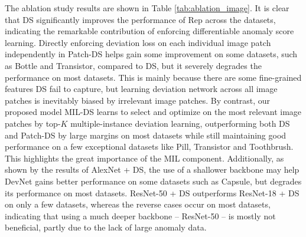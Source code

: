 \documentclass[10pt,journal,compsoc]{IEEEtran}
\begin{document}
The ablation study results are shown in Table \ref{tab:ablation_image}. It is clear that DS significantly improves the performance of Rep across the datasets, indicating the remarkable contribution of enforcing differentiable anomaly score learning. Directly enforcing deviation loss on each individual image patch independently in Patch-DS helps gain some improvement on some datasets, such as Bottle and Transistor, compared to DS, but it severely degrades the performance on most datasets. This is mainly because there are some fine-grained features DS fail to capture, but learning deviation network across all image patches is inevitably biased by irrelevant image patches. By contrast, our proposed model MIL-DS learns to select and optimize on the most relevant image patches by top-$K$ multiple-instance deviation learning, outperforming both DS and Patch-DS by large margins on most datasets while still maintaining good performance on a few exceptional datasets like Pill, Transistor and Toothbrush. This highlights the great importance of the MIL component. Additionally, as shown by the results of AlexNet + DS, the use of a shallower backbone may help DevNet gains better performance on some datasets such as Capsule, but degrades its performance on most datasets. ResNet-50 + DS outperforms ResNet-18 + DS on only a few datasets, whereas the reverse cases occur on most datasets, indicating that using a much deeper backbone -- ResNet-50 -- is mostly not beneficial, partly due to the lack of large anomaly data. 
\end{document}
